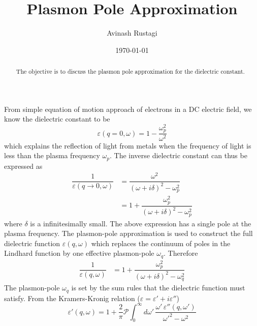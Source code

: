 \documentclass[aps,prb,onecolumn,notitlepage,showpacs,floatfix,superscriptaddress]{revtex4-1}
\begin{document}
\title{Plasmon Pole Approximation}

\author{Avinash Rustagi}
%
\date{\today}
\begin{abstract}
The objective is to discuss the plasmon pole approximation for the dielectric constant.
\end{abstract}

\maketitle
%
From simple equation of motion approach of electrons in a DC electric field, we know the dielectric constant to be
\begin{equation}
\varepsilon(q=0,\omega) = 1-\dfrac{\omega_{p}^2}{\omega^2}
\end{equation}
which explains the reflection of light from metals when the frequency of light is less than the plasma frequency $\omega_p$. The inverse dielectric constant can thus be expressed as
\begin{equation}
\begin{split}
\dfrac{1}{\varepsilon(q\rightarrow0,\omega)} &= \dfrac{\omega^2}{(\omega + i \delta)^2-\omega_p^2}\\
&=1+ \dfrac{\omega_p^2}{(\omega + i \delta)^2-\omega_p^2}
\end{split} 
\end{equation}
where $\delta$ is a infinitesimally small. The above expression has a single pole at the plasma frequency. The plasmon-pole approximation is used to construct the full dielectric function $\varepsilon(q,\omega)$ which replaces the continuum of poles in the Lindhard function by one effective plasmon-pole $\omega_q$. Therefore
\begin{equation}
\begin{split}
\dfrac{1}{\varepsilon(q,\omega)}&=1+ \dfrac{\omega_p^2}{(\omega + i \delta)^2-\omega_q^2}
\end{split} 
\end{equation}
The plasmon-pole $\omega_q$ is set by the sum rules that the dielectric function must satisfy. From the Kramers-Kronig relation ($\varepsilon=\varepsilon' + i \varepsilon''$)
\begin{equation}
\varepsilon'(q,\omega) = 1+ \dfrac{2}{\pi} \mathcal{P} \int_0^\infty d\omega' \, \dfrac{\omega' \, \varepsilon''(q,\omega')}{\omega'^2-\omega^2}
\end{equation}
\end{document}
